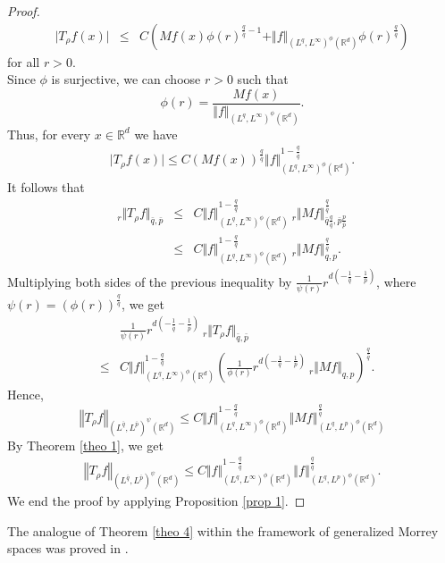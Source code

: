 \documentclass[a4paper,12pt,intlimits,oneside]{amsart}
\numberwithin{equation}{section}
\numberwithin{equation}{section}
\theoremstyle{definition}
\begin{document}
\begin{proof}
\begin{eqnarray*}
\vert T_{\rho} f(x) \vert &\leq& C\left(M f(x) \phi(r)^{\frac{q}{\bar{q}}-1}+\Vert f \Vert_{(L^{q},L^{\infty})^{\phi}(\mathbb{R}^{d})}\phi(r)^{\frac{q}{\bar{q}}}\right)
\end{eqnarray*}
for all $ r > 0 $. \\ 
Since $ \phi $ is surjective, we can choose  $ r > 0 $ such that $$ \phi(r)= \frac{M f(x)}{\Vert f \Vert_{(L^{q},L^{\infty})^{\phi}(\mathbb{R}^{d})}}. $$
Thus, for every $ x \in \mathbb{R}^{d} $ we have  
\begin{eqnarray*} \label{rel 55}
\vert T_{\rho} f(x) \vert \leq C (M f(x))^{\frac{q}{\bar{q}}}\Vert f \Vert^{1-\frac{q}{\bar{q}}}_{(L^{q},L^{\infty})^{\phi}(\mathbb{R}^{d})}.
\end{eqnarray*}
It follows that 
\begin{eqnarray*}
_{r}\Vert T_{\rho} f \Vert_{\bar{q},\bar{p}} &\leq& C\Vert f \Vert^{1-\frac{q}{\bar{q}}}_{(L^{q},L^{\infty})^{\phi}(\mathbb{R}^{d})}\:_{r}\Vert M f \Vert^{\frac{q}{\bar{q}}}_{\bar{q}\frac{q}{\bar{q}},\bar{p}\frac{p}{\bar{p}}}\\
&\leq& C\Vert f \Vert^{1-\frac{q}{\bar{q}}}_{(L^{q},L^{\infty})^{\phi}(\mathbb{R}^{d})}\:_{r}\Vert M f \Vert^{\frac{q}{\bar{q}}}_{q,p}.
\end{eqnarray*}
Multiplying both sides of the previous inequality by $ \frac{1}{\psi(r)} r^{d(-\frac{1}{\bar{q}}-\frac{1}{\bar{p}})} $, where  $\psi(r)= (\phi(r))^{\frac{q}{\bar{q}}}$, we get 
\begin{eqnarray*}
&&\frac{1}{\psi(r)} r^{d(-\frac{1}{\bar{q}}-\frac{1}{\bar{p}})} \:_{r}\Vert T_{\rho} f \Vert_{\bar{q},\bar{p}} \\  &\leq& C\Vert f \Vert^{1-\frac{q}{\bar{q}}}_{(L^{q},L^{\infty})^{\phi}(\mathbb{R}^{d})}   \left(  \frac{1}{\phi(r)} r^{d(-\frac{1}{q}-\frac{1}{p})}\:_{r}\Vert M f \Vert_{q,p}  \right)^{\frac{q}{\bar{q}}}.
\end{eqnarray*}
Hence,  $$\left\Vert T_{\rho}f \right\Vert_{(L^{\bar{q}},L^{\bar{p}})^{\psi}(\mathbb{R}^{d})} \leq C\Vert f \Vert^{1-\frac{q}{\bar{q}}}_{(L^{q},L^{\infty})^{\phi}(\mathbb{R}^{d})} \left\Vert Mf  \right\Vert^{\frac{q}{\bar{q}}}_{(L^{q},L^{p})^{\phi}(\mathbb{R}^{d})}$$
By Theorem \ref{theo 1}, we get 
\begin{eqnarray*}\label{rel 18}
\left\Vert T_{\rho}f \right\Vert_{(L^{\bar{q}},L^{\bar{p}})^{\psi}(\mathbb{R}^{d})} \leq C\Vert f \Vert^{1-\frac{q}{\bar{q}}}_{(L^{q},L^{\infty})^{\phi}(\mathbb{R}^{d})}  \left\Vert f  \right\Vert^{\frac{q}{\bar{q}}}_{(L^{q},L^{p})^{\phi}(\mathbb{R}^{d})}.
\end{eqnarray*}
We end the proof by applying Proposition \ref{prop 1}.
\end{proof}
The analogue of Theorem \ref{theo 4} within the framework of generalized Morrey spaces was proved in \cite[Theorem B]{GE0}. 
\end{document}

